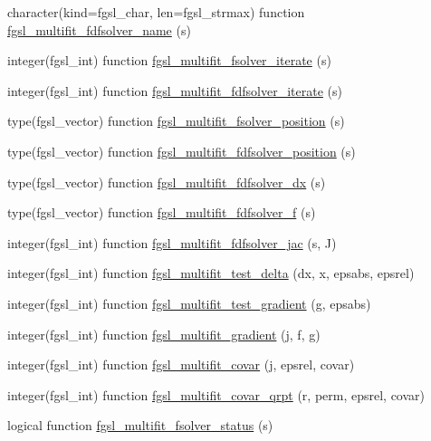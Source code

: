 \begin{DoxyCompactItemize}
\item 
character(kind=fgsl\+\_\+char, len=fgsl\+\_\+strmax) function \hyperlink{multifit_8finc_a771b7c045ca45cddece1bab084d81687}{fgsl\+\_\+multifit\+\_\+fdfsolver\+\_\+name} (s)
\item 
integer(fgsl\+\_\+int) function \hyperlink{multifit_8finc_a6262c763ec214a5143c1aec91f5f61a0}{fgsl\+\_\+multifit\+\_\+fsolver\+\_\+iterate} (s)
\item 
integer(fgsl\+\_\+int) function \hyperlink{multifit_8finc_a62a0cfaf39d63305b4e9ec2feae62e58}{fgsl\+\_\+multifit\+\_\+fdfsolver\+\_\+iterate} (s)
\item 
type(fgsl\+\_\+vector) function \hyperlink{multifit_8finc_ae18bf66b9d8137530d9e00d789cd1b47}{fgsl\+\_\+multifit\+\_\+fsolver\+\_\+position} (s)
\item 
type(fgsl\+\_\+vector) function \hyperlink{multifit_8finc_a21df223213883480f389a670b22333a2}{fgsl\+\_\+multifit\+\_\+fdfsolver\+\_\+position} (s)
\item 
type(fgsl\+\_\+vector) function \hyperlink{multifit_8finc_a5d5d7621f0e81fd1eaf2c01119a9e9ee}{fgsl\+\_\+multifit\+\_\+fdfsolver\+\_\+dx} (s)
\item 
type(fgsl\+\_\+vector) function \hyperlink{multifit_8finc_af31bdf3274659259d4a5bc4eb3e93275}{fgsl\+\_\+multifit\+\_\+fdfsolver\+\_\+f} (s)
\item 
integer(fgsl\+\_\+int) function \hyperlink{multifit_8finc_a8a174a6e7178e75cba20d1f05060218b}{fgsl\+\_\+multifit\+\_\+fdfsolver\+\_\+jac} (s, J)
\item 
integer(fgsl\+\_\+int) function \hyperlink{multifit_8finc_a32b6331d1e1c82610b617328dc3234cf}{fgsl\+\_\+multifit\+\_\+test\+\_\+delta} (dx, x, epsabs, epsrel)
\item 
integer(fgsl\+\_\+int) function \hyperlink{multifit_8finc_a6f3f38114ba37459b8d28d7757b0ae3c}{fgsl\+\_\+multifit\+\_\+test\+\_\+gradient} (g, epsabs)
\item 
integer(fgsl\+\_\+int) function \hyperlink{multifit_8finc_a0451b9c85929c00cd7c5a6ad103dfea3}{fgsl\+\_\+multifit\+\_\+gradient} (j, f, g)
\item 
integer(fgsl\+\_\+int) function \hyperlink{multifit_8finc_a843fbc4d78a3e84e537c8b2c10eff8ef}{fgsl\+\_\+multifit\+\_\+covar} (j, epsrel, covar)
\item 
integer(fgsl\+\_\+int) function \hyperlink{multifit_8finc_a043019a06e0ad746e55565347e63ad5a}{fgsl\+\_\+multifit\+\_\+covar\+\_\+qrpt} (r, perm, epsrel, covar)
\item 
logical function \hyperlink{multifit_8finc_a3945d89bd5d38c87bb6808ee41382e31}{fgsl\+\_\+multifit\+\_\+fsolver\+\_\+status} (s)

\end{DoxyCompactItemize}
